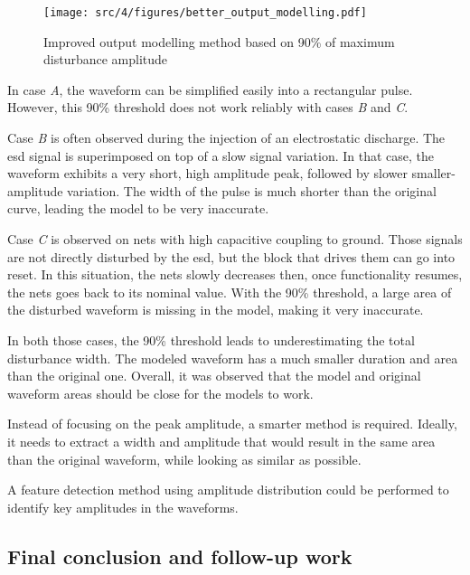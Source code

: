 \begin{figure}[!h]
  \centering
  \texttt{[image: src/4/figures/better\_output\_modelling.pdf]}
  \caption{Improved output modelling method based on 90\% of maximum disturbance amplitude}
  \label{fig:impact-single-failure-criteria}
\end{figure}

In case \textit{A}, the waveform can be simplified easily into a rectangular pulse.
However, this 90\% threshold does not work reliably with cases \textit{B} and \textit{C}.

Case \textit{B} is often observed during the injection of an electrostatic discharge.
The \gls{esd} signal is superimposed on top of a slow signal variation.
In that case, the waveform exhibits a very short, high amplitude peak, followed by slower smaller-amplitude variation.
The width of the pulse is much shorter than the original curve, leading the model to be very inaccurate.

Case \textit{C} is observed on nets with high capacitive coupling to ground.
Those signals are not directly disturbed by the \gls{esd}, but the block that drives them can go into reset.
In this situation, the nets slowly decreases then, once functionality resumes, the nets goes back to its nominal value.
With the 90\% threshold, a large area of the disturbed waveform is missing in the model, making it very inaccurate.

In both those cases, the 90\% threshold leads to underestimating the total disturbance width.
The modeled waveform has a much smaller duration and area than the original one.
Overall, it was observed that the model and original waveform areas should be close for the models to work.

Instead of focusing on the peak amplitude, a smarter method is required.
Ideally, it needs to extract a width and amplitude that would result in the same area than the original waveform, while looking as similar as possible.

A feature detection method using amplitude distribution could be performed to identify key amplitudes in the waveforms.

\subsection{Final conclusion and follow-up work}
\label{sec:limits-block-cz-final}

